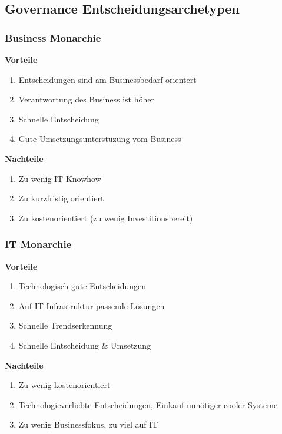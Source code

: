 \subsection{Governance Entscheidungsarchetypen}
\subsubsection{Business Monarchie}
\textbf{Vorteile}
\begin{enumerate}
	\item Entscheidungen sind am Businessbedarf orientert
	\item Verantwortung des Business ist höher
	\item Schnelle Entscheidung
	\item Gute Umsetzungsunterstüzung vom Business
\end{enumerate}
\textbf{Nachteile}
\begin{enumerate}
	\item Zu wenig IT Knowhow
	\item Zu kurzfristig orientiert
	\item Zu kostenorientiert (zu wenig Investitionsbereit)
\end{enumerate}
\subsubsection{IT Monarchie}
\textbf{Vorteile}
\begin{enumerate}
	\item Technologisch gute Entscheidungen
	\item Auf IT Infrastruktur passende Lösungen
	\item Schnelle Trendserkennung
	\item Schnelle Entscheidung \& Umsetzung
\end{enumerate}
\textbf{Nachteile}
\begin{enumerate}
	\item Zu wenig kostenorientiert
	\item Technologieverliebte Entscheidungen, Einkauf unnötiger cooler Systeme
	\item Zu wenig Businessfokus, zu viel auf IT
\end{enumerate}

